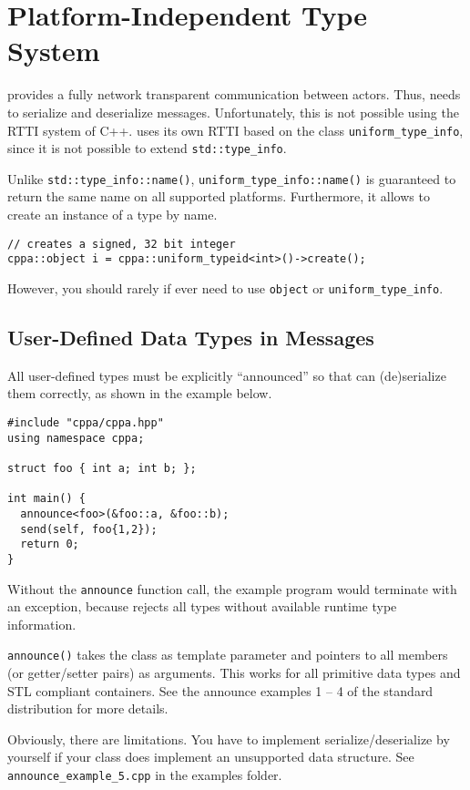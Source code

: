 \section{Platform-Independent Type System}
\label{Sec::TypeSystem}

\libcppa provides a fully network transparent communication between actors.
Thus, \libcppa needs to serialize and deserialize messages.
Unfortunately, this is not possible using the RTTI system of C++.
\libcppa uses its own RTTI based on the class \lstinline^uniform_type_info^, since it is not possible to extend \lstinline^std::type_info^.

Unlike \lstinline^std::type_info::name()^, \lstinline^uniform_type_info::name()^ is guaranteed to return the same name on all supported platforms. Furthermore, it allows to create an instance of a type by name.

\begin{lstlisting}
// creates a signed, 32 bit integer
cppa::object i = cppa::uniform_typeid<int>()->create();
\end{lstlisting}

However, you should rarely if ever need to use \lstinline^object^ or \lstinline^uniform_type_info^.

\subsection{User-Defined Data Types in Messages}
\label{Sec::TypeSystem::UserDefined}

All user-defined types must be explicitly ``announced'' so that \libcppa can (de)serialize them correctly, as shown in the example below.

\begin{lstlisting}
#include "cppa/cppa.hpp"
using namespace cppa;

struct foo { int a; int b; };

int main() {
  announce<foo>(&foo::a, &foo::b);
  send(self, foo{1,2});
  return 0;
}
\end{lstlisting}

Without the \lstinline^announce^ function call, the example program would terminate with an exception, because \libcppa rejects all types without available runtime type information.

\lstinline^announce()^ takes the class as template parameter and pointers to all members (or getter/setter pairs) as arguments.
This works for all primitive data types and STL compliant containers.
See the announce examples 1 -- 4 of the standard distribution for more details.

Obviously, there are limitations.
You have to implement serialize/deserialize by yourself if your class does implement an unsupported data structure.
See \lstinline^announce_example_5.cpp^ in the examples folder.
